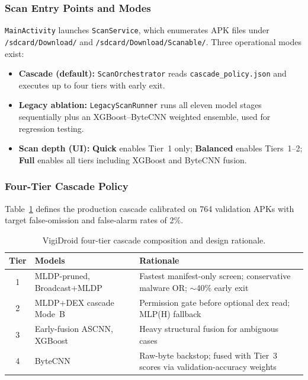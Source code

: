 \subsubsection{Scan Entry Points and Modes}
\texttt{MainActivity} launches \texttt{ScanService}, which enumerates APK files under \texttt{/sdcard/Download/} and \texttt{/sdcard/Download/Scanable/}. Three operational modes exist:
\begin{itemize}
 \item \textbf{Cascade (default):} \texttt{ScanOrchestrator} reads \texttt{cascade\_policy.json} and executes up to four tiers with early exit.
 \item \textbf{Legacy ablation:} \texttt{LegacyScanRunner} runs all eleven model stages sequentially plus an XGBoost--ByteCNN weighted ensemble, used for regression testing.
 \item \textbf{Scan depth (UI):} \textbf{Quick} enables Tier~1 only; \textbf{Balanced} enables Tiers~1--2; \textbf{Full} enables all tiers including XGBoost and ByteCNN fusion.
\end{itemize}

\subsubsection{Four-Tier Cascade Policy}
Table~\ref{tab:cascade-tiers} defines the production cascade calibrated on 764 validation APKs with target false-omission and false-alarm rates of 2\%.

\begin{table}[H]
\centering
\small
\begin{tabular}{@{}clp{7.5cm}@{}}
\toprule
\textbf{Tier} & \textbf{Models} & \textbf{Rationale} \\
\midrule
1 & MLDP-pruned, Broadcast+MLDP & Fastest manifest-only screen; conservative malware OR; $\sim$40\% early exit \\
2 & MLDP+DEX cascade Mode~B & Permission gate before optional dex read; MLP(H) fallback \\
3 & Early-fusion ASCNN, XGBoost & Heavy structural fusion for ambiguous cases \\
4 & ByteCNN & Raw-byte backstop; fused with Tier~3 scores via validation-accuracy weights \\
\bottomrule
\end{tabular}
\caption{VigiDroid four-tier cascade composition and design rationale.}
\label{tab:cascade-tiers}
\end{table}

